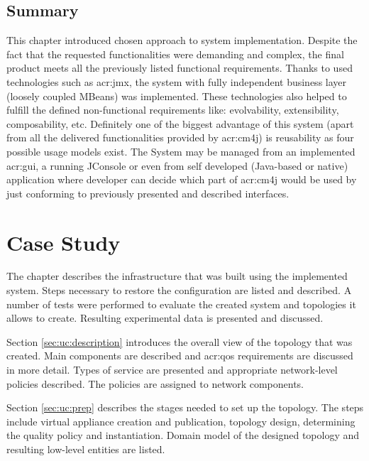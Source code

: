 \documentclass[11pt,openany]{book}
\begin{document}
    \section*{Summary}
    \label{sec:impl:summary}

      This chapter introduced chosen approach to system implementation. Despite the fact that the requested functionalities
      were demanding and complex, the final product meets all the previously listed functional requirements. Thanks to used
      technologies such as \gls{acr:jmx}, the system with fully independent business layer (loosely coupled MBeans) was
      implemented. These technologies also helped to fulfill the defined non-functional requirements like: evolvability,
      extensibility, composability, etc. Definitely one of the biggest advantage of this system (apart from all
      the delivered functionalities provided by \gls{acr:cm4j}) is reusability as four possible usage models exist. The System may
      be managed from an implemented \gls{acr:gui}, a running JConsole or even from self developed (Java-based or native)
      application where developer can decide which part of \gls{acr:cm4j} would be used by just conforming to previously
      presented and described interfaces.


  \chapter{Case Study}
  \label{chap:cs}


    The chapter describes the infrastructure that was built using the implemented system. Steps necessary to restore the
    configuration are listed and described. A number of tests were performed to evaluate the created system and
    topologies it allows to create. Resulting experimental data is presented and discussed.

    Section \ref{sec:uc:description} introduces the overall view of the topology that was created. Main components are
    described and \gls{acr:qos} requirements are discussed in more detail. Types of service are presented and
    appropriate network-level policies described. The policies are assigned to network components.

    Section \ref{sec:uc:prep} describes the stages needed to set up the topology. The steps include virtual appliance
    creation and publication, topology design, determining the quality policy and instantiation. Domain model of the
    designed topology and resulting low-level entities are listed.
\end{document}
